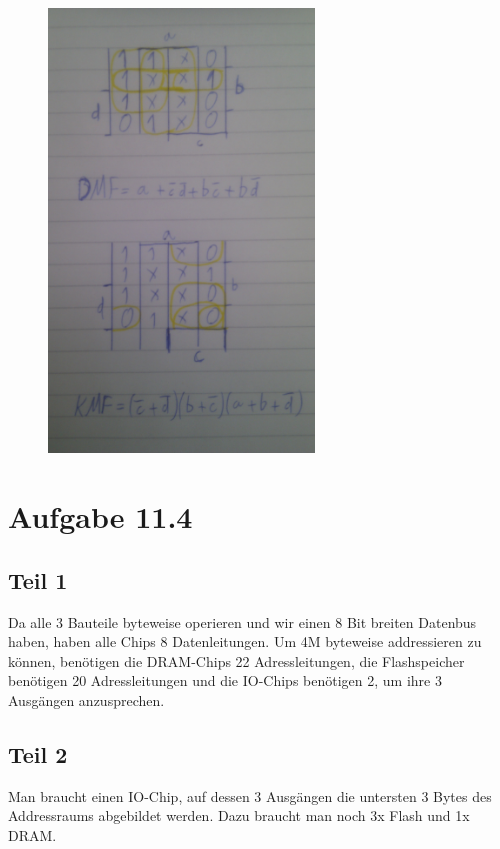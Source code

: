 \documentclass[10pt,a4paper]{article}
\begin{document}
\begin{figure}[h]
\includegraphics[width=200pt]{11_3}
\end{figure}

\section*{Aufgabe 11.4}

\subsection*{Teil 1}

Da alle 3 Bauteile byteweise operieren und wir einen 8 Bit breiten Datenbus haben, haben alle Chips 8 Datenleitungen.
Um 4M byteweise addressieren zu können, benötigen die DRAM-Chips 22 Adressleitungen,
die Flashspeicher benötigen 20 Adressleitungen und die IO-Chips benötigen 2, um ihre 3 Ausgängen anzusprechen.

\subsection*{Teil 2}

Man braucht einen IO-Chip, auf dessen 3 Ausgängen die untersten 3 Bytes des Addressraums abgebildet werden.
Dazu braucht man noch 3x Flash und 1x DRAM.
\end{document}
